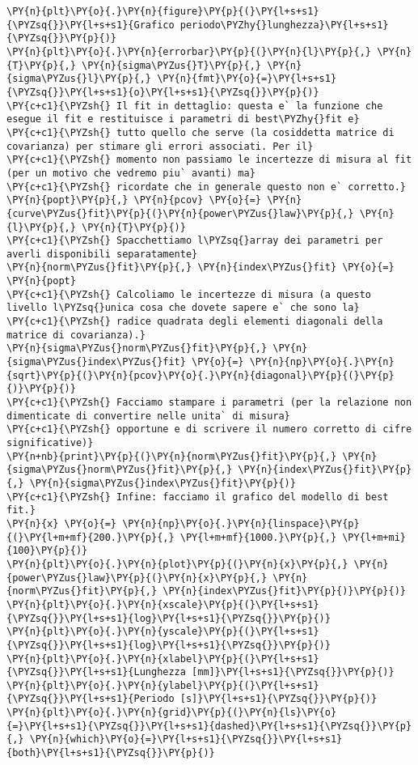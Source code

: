 \begin{Verbatim}[label=\makebox{\href{https://github.com/unipi-physics-labs/lab1-sheets/tree/main/snippy/pendolo_semplice.py}{https://github.com/.../pendolo\_semplice.py}},commandchars=\\\{\}]
\PY{n}{plt}\PY{o}{.}\PY{n}{figure}\PY{p}{(}\PY{l+s+s1}{\PYZsq{}}\PY{l+s+s1}{Grafico periodo\PYZhy{}lunghezza}\PY{l+s+s1}{\PYZsq{}}\PY{p}{)}
\PY{n}{plt}\PY{o}{.}\PY{n}{errorbar}\PY{p}{(}\PY{n}{l}\PY{p}{,} \PY{n}{T}\PY{p}{,} \PY{n}{sigma\PYZus{}T}\PY{p}{,} \PY{n}{sigma\PYZus{}l}\PY{p}{,} \PY{n}{fmt}\PY{o}{=}\PY{l+s+s1}{\PYZsq{}}\PY{l+s+s1}{o}\PY{l+s+s1}{\PYZsq{}}\PY{p}{)}
\PY{c+c1}{\PYZsh{} Il fit in dettaglio: questa e` la funzione che esegue il fit e restituisce i parametri di best\PYZhy{}fit e}
\PY{c+c1}{\PYZsh{} tutto quello che serve (la cosiddetta matrice di covarianza) per stimare gli errori associati. Per il}
\PY{c+c1}{\PYZsh{} momento non passiamo le incertezze di misura al fit (per un motivo che vedremo piu` avanti) ma}
\PY{c+c1}{\PYZsh{} ricordate che in generale questo non e` corretto.}
\PY{n}{popt}\PY{p}{,} \PY{n}{pcov} \PY{o}{=} \PY{n}{curve\PYZus{}fit}\PY{p}{(}\PY{n}{power\PYZus{}law}\PY{p}{,} \PY{n}{l}\PY{p}{,} \PY{n}{T}\PY{p}{)}
\PY{c+c1}{\PYZsh{} Spacchettiamo l\PYZsq{}array dei parametri per averli disponibili separatamente}
\PY{n}{norm\PYZus{}fit}\PY{p}{,} \PY{n}{index\PYZus{}fit} \PY{o}{=} \PY{n}{popt}
\PY{c+c1}{\PYZsh{} Calcoliamo le incertezze di misura (a questo livello l\PYZsq{}unica cosa che dovete sapere e` che sono la}
\PY{c+c1}{\PYZsh{} radice quadrata degli elementi diagonali della matrice di covarianza).}
\PY{n}{sigma\PYZus{}norm\PYZus{}fit}\PY{p}{,} \PY{n}{sigma\PYZus{}index\PYZus{}fit} \PY{o}{=} \PY{n}{np}\PY{o}{.}\PY{n}{sqrt}\PY{p}{(}\PY{n}{pcov}\PY{o}{.}\PY{n}{diagonal}\PY{p}{(}\PY{p}{)}\PY{p}{)}
\PY{c+c1}{\PYZsh{} Facciamo stampare i parametri (per la relazione non dimenticate di convertire nelle unita` di misura}
\PY{c+c1}{\PYZsh{} opportune e di scrivere il numero corretto di cifre significative)}
\PY{n+nb}{print}\PY{p}{(}\PY{n}{norm\PYZus{}fit}\PY{p}{,} \PY{n}{sigma\PYZus{}norm\PYZus{}fit}\PY{p}{,} \PY{n}{index\PYZus{}fit}\PY{p}{,} \PY{n}{sigma\PYZus{}index\PYZus{}fit}\PY{p}{)}
\PY{c+c1}{\PYZsh{} Infine: facciamo il grafico del modello di best fit.}
\PY{n}{x} \PY{o}{=} \PY{n}{np}\PY{o}{.}\PY{n}{linspace}\PY{p}{(}\PY{l+m+mf}{200.}\PY{p}{,} \PY{l+m+mf}{1000.}\PY{p}{,} \PY{l+m+mi}{100}\PY{p}{)}
\PY{n}{plt}\PY{o}{.}\PY{n}{plot}\PY{p}{(}\PY{n}{x}\PY{p}{,} \PY{n}{power\PYZus{}law}\PY{p}{(}\PY{n}{x}\PY{p}{,} \PY{n}{norm\PYZus{}fit}\PY{p}{,} \PY{n}{index\PYZus{}fit}\PY{p}{)}\PY{p}{)}
\PY{n}{plt}\PY{o}{.}\PY{n}{xscale}\PY{p}{(}\PY{l+s+s1}{\PYZsq{}}\PY{l+s+s1}{log}\PY{l+s+s1}{\PYZsq{}}\PY{p}{)}
\PY{n}{plt}\PY{o}{.}\PY{n}{yscale}\PY{p}{(}\PY{l+s+s1}{\PYZsq{}}\PY{l+s+s1}{log}\PY{l+s+s1}{\PYZsq{}}\PY{p}{)}
\PY{n}{plt}\PY{o}{.}\PY{n}{xlabel}\PY{p}{(}\PY{l+s+s1}{\PYZsq{}}\PY{l+s+s1}{Lunghezza [mm]}\PY{l+s+s1}{\PYZsq{}}\PY{p}{)}
\PY{n}{plt}\PY{o}{.}\PY{n}{ylabel}\PY{p}{(}\PY{l+s+s1}{\PYZsq{}}\PY{l+s+s1}{Periodo [s]}\PY{l+s+s1}{\PYZsq{}}\PY{p}{)}
\PY{n}{plt}\PY{o}{.}\PY{n}{grid}\PY{p}{(}\PY{n}{ls}\PY{o}{=}\PY{l+s+s1}{\PYZsq{}}\PY{l+s+s1}{dashed}\PY{l+s+s1}{\PYZsq{}}\PY{p}{,} \PY{n}{which}\PY{o}{=}\PY{l+s+s1}{\PYZsq{}}\PY{l+s+s1}{both}\PY{l+s+s1}{\PYZsq{}}\PY{p}{)}


\end{Verbatim}
